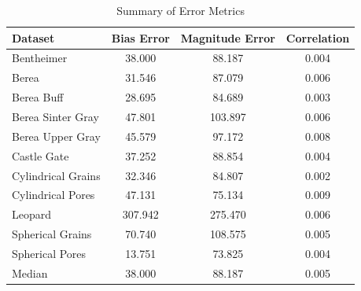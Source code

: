 \begin{table}[h!]
    \centering
    \caption{Summary of Error Metrics}
    \label{tab:metrics_summary}
\begin{tabular}{lccc}
\toprule
Dataset & Bias Error & Magnitude Error & Correlation \\
\midrule
Bentheimer & 38.000 & 88.187 & 0.004 \\
Berea & 31.546 & 87.079 & 0.006 \\
Berea Buff & 28.695 & 84.689 & 0.003 \\
Berea Sinter Gray & 47.801 & 103.897 & 0.006 \\
Berea Upper Gray & 45.579 & 97.172 & 0.008 \\
Castle Gate & 37.252 & 88.854 & 0.004 \\
Cylindrical Grains & 32.346 & 84.807 & 0.002 \\
Cylindrical Pores & 47.131 & 75.134 & 0.009 \\
Leopard & 307.942 & 275.470 & 0.006 \\
Spherical Grains & 70.740 & 108.575 & 0.005 \\
Spherical Pores & 13.751 & 73.825 & 0.004 \\
\hline
Median & 38.000 & 88.187 & 0.005 \\
\bottomrule
\end{tabular}
\end{table}
